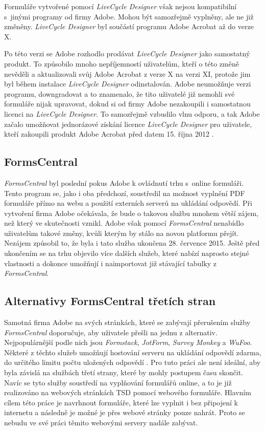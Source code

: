 \documentclass[czech,BP]{thesiskiv}
\begin{document}
Formuláře vytvořené pomocí \emph{LiveCycle Designer} však nejsou kompatibilní s~jinými programy od firmy Adobe. Mohou být samozřejmě vyplněny, ale ne již změněny. \emph{LiveCycle Designer} byl součástí programu Adobe Acrobat až do verze X. 

Po této verzi se Adobe rozhodlo prodávat \emph{LiveCycle Designer} jako samostatný produkt. To způsobilo mnoho nepříjemností uživatelům, kteří o této změně nevěděli a aktualizovali svůj Adobe Acrobat z verze X na verzi XI, protože jim byl během instalace \emph{LiveCycle Designer} odinstalován. Adobe neumožňuje verzi programu, downgradovat a to znamenalo, že tito uživatelé již nemohli své formuláře nijak upravovat, dokud si od firmy Adobe nezakoupili i samostatnou licenci na \emph{LiveCycle Designer}. To samozřejmě vzbudilo vlnu odporu, a tak Adobe začalo umožňovat jednorázové získání licence \emph{LiveCycle Designer} pro uživatele, kteří zakoupili produkt Adobe Acrobat před datem 15. října 2012 \cite{Adobe_LVD}\cite{Adobe_LVD_forum}.
\subsection{FormsCentral}
\emph{FormsCentral} byl poslední pokus Adobe k ovládnutí trhu s~online formuláři. Tento program se, jako i oba předchozí, soustředil na možnost vyplnění PDF formuláře přímo na webu a použití externích serverů na ukládání odpovědí. Při vytvoření firma Adobe očekávala, že bude o takovou službu mnohem větší zájem, než který ve skutečnosti vznikl. Adobe však pomocí \emph{FormsCentral} nenabídlo uživatelům takové změny, kvůli kterým by stálo na novou platformu přejít. Nezájem způsobil to, že byla i tato služba ukončena 28. července 2015. Ještě před ukončením se na trhu objevilo více dalších služeb, které nabízí naprosto stejné vlastnosti a dokonce umožňují i naimportovat již stávající tabulky z \emph{FormsCentral}\cite{Adobe_FormsCentral}.

\subsection{Alternativy FormsCentral třetích stran}
Samotná firma Adobe na svých stránkách, které se zabývají přerušením služby \emph{FormsCentral} doporučuje, aby uživatele přešli na jednu z alternativ. Nejpopulárnější podle nich jsou \emph{Formstack}, \emph{JotForm}, \emph{Survey Monkey} a \emph{WuFoo}. Některé z těchto služeb umožňují hostování serveru na ukládání odpovědí zdarma, do určitého limitu počtu uložených odpovědí \cite{Adobe_FormsCentral}. 
Pro tuto práci ale není ideální, aby byla závislá na službách třetí strany, které by mohly postupem času skončit. Navíc se tyto služby soustředí na vyplňování formulářů online, a to je již realizováno na webových stránkách TSD pomocí webového formuláře. Hlavním cílem této práce je navrhnout formuláře, které lze vyplnit i bez připojení k internetu a následně je možné je přes webové stránky pouze nahrát. Proto se nebudu ve své práci těmito webovými servery nadále zabývat.
\end{document}
